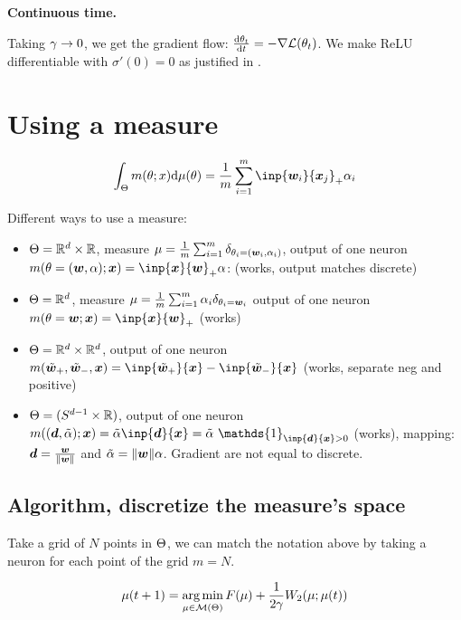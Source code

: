 \textbf{Continuous time.}

Taking $\gamma \to 0$, we get the gradient flow: $\frac{\mathrm{d} \theta_t}{\mathrm{d} t} = - \nabla \mathcal{L}(\theta_t)$. We make ReLU differentiable with $\sigma'(0)=0$ as justified in \citep{boursierGradientFlowDynamics2022}.

\section{Using a measure}

\begin{equation}
	\int_\paramS m(\param; x) \dd \mu(\param) = \frac{1}{m} \sum_{i=1}^{m} \inp{\vw_i}{\vx_j}_+ \alpha_i
\end{equation}

Different ways to use a measure:

\begin{itemize}
	\item $\Theta = \mathbb{R}^d \times \mathbb{R}$, measure $\mu = \frac{1}{m} \sum_{i=1}^{m} \delta_{\theta_i = ({\bm{w}}_i, \alpha_i)}$, output of one neuron $m(\param=(\vw,\alpha); \vx) = \inp{\vx}{\vw}_+ \alpha$: (works, output matches discrete)
	\item $\Theta = \mathbb{R}^d$, measure $\mu = \frac{1}{m} \sum_{i=1}^{m} \alpha_i \delta_{\theta_i = {\bm{w}}_i}$ output of one neuron $m(\param=\vw; \vx) = \inp{\vx}{\vw}_+$ (works)
	\item $\Theta = \mathbb{R}^d \times \mathbb{R}^d$, output of one neuron $m(\tilde{\vw}_+, \tilde{\vw}_-, \vx) = \inp{\tilde{\vw}_+}{\vx} - \inp{\tilde{\vw}_-}{\vx}$ (works, separate neg and positive)
	\item $\Theta = (S^{d-1} \times \mathbb{R})$, output of one neuron $m((\vd, \tilde{\alpha}); \vx) = \tilde{\alpha} \inp{\vd}{\vx} = \tilde{\alpha}\  \mathds{1}_{\inp{\vd}{\vx}>0} $ (works), mapping: ${\bm{d}} = \frac{{\bm{w}}}{\lVert{\bm{w}}\rVert}$ and $\tilde{\alpha}=\lVert{\bm{w}}\rVert \alpha$. Gradient are not equal to discrete.
\end{itemize}

\subsection{Algorithm, discretize the measure's space}

Take a grid of $N$ points in $\Theta$, we can match the notation above by taking a neuron for each point of the grid $m=N$.

\begin{equation}
	\mu(t+1) = \operatorname*{arg\,min}_{\mu \in \mathcal{M}(\Theta)} F(\mu) + \frac{1}{2 \gamma} W_2(\mu; \mu(t))
\end{equation}

